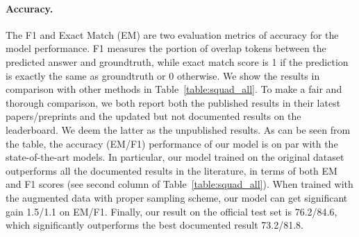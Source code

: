 \documentclass{article} \usepackage{iclr2018_conference,times}
\begin{document}
\paragraph{Accuracy.}
The F1 and Exact Match (EM) are two evaluation metrics of accuracy for the model performance. F1 measures the portion of overlap tokens between the predicted answer and groundtruth, while exact match score is 1 if the prediction is exactly the same as groundtruth or 0 otherwise. We show the results in comparison with other methods in Table~\ref{table:squad_all}. To make a fair and thorough comparison, we both report both the published results in their latest papers/preprints and the updated but not documented results on the leaderboard. We deem the latter as the unpublished results. As can be seen from the table, the accuracy (EM/F1) performance of our model is on par with the state-of-the-art models. In particular, our model trained on the original dataset outperforms all the documented results in the literature, in terms of both EM and F1 scores (see second column of Table~\ref{table:squad_all}). When trained with the augmented data with proper sampling scheme, our model can get significant gain 1.5/1.1 on EM/F1. Finally, our result on the official test set is 76.2/84.6, which significantly outperforms the best documented result 73.2/81.8. 
\end{document}
